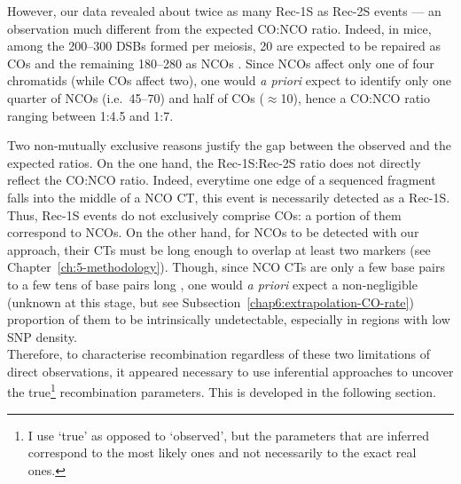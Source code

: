 However, our data revealed about twice as many Rec-1S as Rec-2S events — an observation much different from the expected CO:NCO ratio.
Indeed, in mice, among the 200--300 DSBs formed per meiosis, 20 are expected to be repaired as COs and the remaining 180--280 as NCOs \citep{baudat2007regulating, martinez-perez2009distribution}. 
Since NCOs affect only one of four chromatids (while COs affect two), one would \textit{a priori} expect to identify only one quarter of NCOs (i.e.\ 45--70) and half of COs ($\approx$10), hence a CO:NCO ratio ranging between 1:4.5 and 1:7. 

Two non-mutually exclusive reasons justify the gap between the observed and the expected ratios.
On the one hand, the Rec-1S:Rec-2S ratio does not directly reflect the CO:NCO ratio.
Indeed, everytime one edge of a sequenced fragment falls into the middle of a NCO CT, this event is necessarily detected as a Rec-1S. 
Thus, Rec-1S events do not exclusively comprise COs: a portion of them correspond to NCOs.
On the other hand, for NCOs to be detected with our approach, their CTs must be long enough to overlap at least two markers (see Chapter~\ref{ch:5-methodology}).
Though, since NCO CTs are only a few base pairs to a few tens of base pairs long \citep{cole2014mouse}, one would \textit{a priori} expect a non-negligible (unknown at this stage, but see Subsection~\ref{chap6:extrapolation-CO-rate}) proportion of them to be intrinsically undetectable, especially in regions with low SNP density.\\

Therefore, to characterise recombination regardless of these two limitations of direct observations, it appeared necessary to use inferential approaches to uncover the true\footnote{I use ‘true’ as opposed to ‘observed’, but the parameters that are inferred correspond to the most likely ones and not necessarily to the exact real ones.} recombination parameters. This is developed in the following section.



